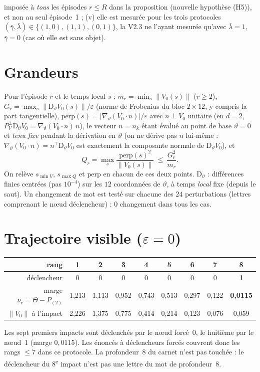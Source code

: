 \documentclass[11pt,a4paper]{article}
\theoremstyle{remark}
\newcommand{\norm}[1]{\lVert #1\rVert}
\newcommand{\vth}{\vartheta}
\newcommand{\D}{\mathrm D}
\begin{document}
impos\'ee \`a \emph{tous} les \'episodes $r\le R$ dans la proposition (nouvelle hypoth\`ese (H5)), et non au seul \'episode~1 ; (v) elle est mesur\'ee pour les trois protocoles $(\bar\gamma,\bar\lambda)\in\{(1,0),(1,1),(0,1)\}$, la V2.3 ne l'ayant mesur\'ee qu'avec $\bar\lambda=1$, $\bar\gamma=0$ (cas o\`u elle est sans objet).

\section{Grandeurs}
Pour l'\'episode $r$ et le temps local $s$ : $m_r=\min_s\norm{V_0(s)}$ ($r\ge2$), $G_r=\max_s\norm{\D_\vth V_0(s)}/\varepsilon$ (norme de Frobenius du bloc $2\times12$, y compris la part tangentielle), $\mathrm{perp}(s)=\lvert\nabla_\vth(V_0\!\cdot n)\rvert/\varepsilon$ avec $n\perp V_0$ unitaire (en $d=2$, $P^\perp_V\D_\vth V_0=\nabla_\vth(V_0\!\cdot n)\,n$), le vecteur $n=n_k$ \'etant \'evalu\'e au point de base $\vth=0$ et \emph{tenu fixe} pendant la d\'erivation en $\vth$ (on ne d\'erive pas $n$ lui-m\^eme : $\nabla_\vth(V_0\!\cdot n)=n^\top\D_\vth V_0$ est exactement la composante normale de $\D_\vth V_0$), et
\[
Q_r=\max_s\frac{\mathrm{perp}(s)^2}{\norm{V_0(s)}}\ \le\ \frac{G_r^2}{m_r}.
\]
On relève $s_{\min V}$, $s_{\max Q}$ et $\mathrm{perp}$ en chacun de ces deux points. $\D_\vth$ : diff\'erences finies centr\'ees (pas $10^{-4}$) sur les $12$ coordonn\'ees de $\vth$, \`a temps \emph{local} fixe (depuis le saut). Un changement de mot est test\'e sur chacune des $24$ perturbations (lettres comprenant le n\oe ud d\'eclencheur) : $0$ changement dans tous les cas.

\section{Trajectoire visible ($\varepsilon=0$)}
\begin{center}\small
\begin{tabular}{r|cccccccc}
\toprule
rang & 1 & 2 & 3 & 4 & 5 & 6 & 7 & 8\\
\midrule
d\'eclencheur & 0&0&0&0&0&0&0&\textbf{1}\\
marge $\nu_r=\Theta-P_{(2)}$ & 1,213 & 1,113 & 0,952 & 0,743 & 0,513 & 0,297 & 0,122 & \textbf{0,0115}\\
$\norm{V_0}$ \`a l'impact & 2,226 & 1,375 & 0,775 & 0,414 & 0,214 & 0,123 & 0,076 & 0,059\\
\bottomrule
\end{tabular}
\end{center}
Les sept premiers impacts sont d\'eclench\'es par le n\oe ud forc\'e~0, le huiti\`eme par le n\oe ud~1 (marge $0{,}0115$). Les \'enonc\'es \`a d\'eclencheurs forc\'es couvrent donc les rangs $\le7$ dans ce protocole. La profondeur~8 du carnet n'est pas touch\'ee : le d\'eclencheur du 8\textsuperscript{e} impact n'est pas une lettre du mot de profondeur~8.
\end{document}
